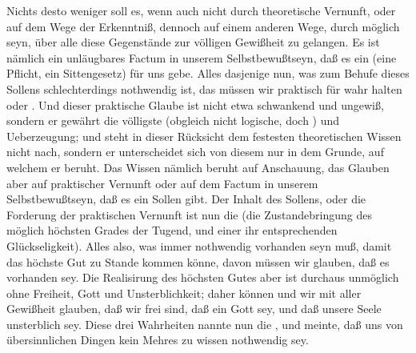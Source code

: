 \begin{aufza}
\item Nichts desto weniger soll es, wenn auch nicht durch theoretische Vernunft, oder auf dem Wege der Erkenntniß, dennoch auf einem anderen Wege, durch  möglich seyn, über alle diese Gegenstände zur völligen Gewißheit zu gelangen. Es ist nämlich ein unläugbares Factum in unserem Selbstbewußtseyn, daß es ein  (eine Pflicht, ein Sittengesetz) für uns gebe. Alles dasjenige nun, was zum Behufe dieses Sollens schlechterdings nothwendig ist, das müssen wir praktisch für wahr halten oder . Und dieser praktische Glaube ist nicht etwa schwankend und ungewiß, sondern er gewährt die völligste (obgleich nicht logische, doch )  und Ueberzeugung; und steht in dieser Rücksicht dem festesten theoretischen Wissen nicht nach, sondern er unterscheidet sich von diesem nur in dem Grunde, auf welchem er beruht. Das Wissen nämlich beruht auf Anschauung, das Glauben aber auf praktischer Vernunft oder auf dem Factum in unserem Selbstbewußtseyn, daß es ein Sollen gibt. Der Inhalt des Sollens, oder die Forderung der praktischen Vernunft ist nun die  (die Zustandebringung des möglich höchsten Grades der Tugend, und einer ihr entsprechenden Glückseligkeit). Alles also, was immer nothwendig vorhanden seyn muß, damit das höchste Gut zu Stande kommen könne, davon müssen wir glauben, daß es vorhanden sey. Die Realisirung des höchsten Gutes aber ist durchaus unmöglich ohne Freiheit, Gott und Unsterblichkeit; daher können und  wir mit aller Gewißheit glauben, daß wir frei sind, daß ein Gott sey, und daß unsere Seele unsterblich sey. Diese drei Wahrheiten nannte nun  die , und meinte, daß uns von übersinnlichen Dingen kein Mehres zu wissen nothwendig sey.
\end{aufza}

